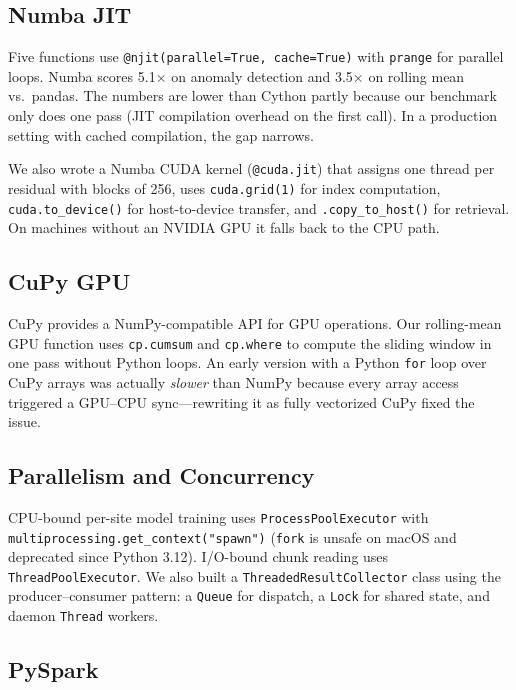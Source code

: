 \documentclass[conference]{IEEEtran}
\begin{document}
\subsection{Numba JIT}

Five functions use \texttt{@njit(parallel=True, cache=True)} with \texttt{prange} for parallel loops. Numba scores 5.1$\times$ on anomaly detection and 3.5$\times$ on rolling mean vs.\ pandas. The numbers are lower than Cython partly because our benchmark only does one pass (JIT compilation overhead on the first call). In a production setting with cached compilation, the gap narrows.

We also wrote a Numba CUDA kernel (\texttt{@cuda.jit}) that assigns one thread per residual with blocks of 256, uses \texttt{cuda.grid(1)} for index computation, \texttt{cuda.to\_device()} for host-to-device transfer, and \texttt{.copy\_to\_host()} for retrieval. On machines without an NVIDIA GPU it falls back to the CPU path.

\subsection{CuPy GPU}

CuPy provides a NumPy-compatible API for GPU operations. Our rolling-mean GPU function uses \texttt{cp.cumsum} and \texttt{cp.where} to compute the sliding window in one pass without Python loops. An early version with a Python \texttt{for} loop over CuPy arrays was actually \textit{slower} than NumPy because every array access triggered a GPU--CPU sync---rewriting it as fully vectorized CuPy fixed the issue.

\subsection{Parallelism and Concurrency}

CPU-bound per-site model training uses \texttt{ProcessPoolExecutor} with \texttt{multiprocessing.get\_context("spawn")} (\texttt{fork} is unsafe on macOS and deprecated since Python 3.12). I/O-bound chunk reading uses \texttt{ThreadPoolExecutor}. We also built a \texttt{ThreadedResultCollector} class using the producer--consumer pattern: a \texttt{Queue} for dispatch, a \texttt{Lock} for shared state, and daemon \texttt{Thread} workers.

\subsection{PySpark}
\end{document}
